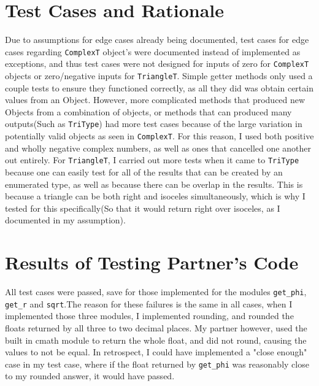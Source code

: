 \documentclass[12pt]{article}
\begin{document}
\section{Test Cases and Rationale} \label{Testing}
Due to assumptions for edge cases already being documented, test cases for edge cases regarding \verb|ComplexT| object's were documented instead of implemented as exceptions, and thus test cases were not designed for inputs of zero for \verb|ComplexT| objects or zero/negative inputs for \verb|TriangleT|. Simple getter methods only used a couple tests to ensure they functioned correctly, as all they did was obtain certain values from an Object. However, more complicated methods that produced new Objects from a combination of objects, or methods that can produced many outputs(Such as \verb|TriType|) had more test cases because of the large variation in potentially valid objects as seen in \verb|ComplexT|. For this reason, I used both positive and wholly negative complex numbers, as well as ones that cancelled one another out entirely. For \verb|TriangleT|, I carried out more tests when it came to \verb|TriType| because one can easily test for all of the results that can be created by an enumerated type, as well as because there can be overlap in the results. This is because a triangle can be both right and isoceles simultaneously, which is why I tested for this specifically(So that it would return right over isoceles, as I documented in my assumption). 
\section{Results of Testing Partner's Code}
All test cases were passed, save for those implemented for the modules \verb|get_phi|, \verb|get_r| and \verb|sqrt|.The reason for these failures is the same in all cases, when I implemented those three modules, I implemented rounding, and rounded the floats returned by all three to two decimal places. My partner however, used the built in cmath module to return the whole float, and did not round, causing the values to not be equal. In retrospect, I could have implemented a "close enough" case in my test case, where if the float returned by  \verb|get_phi| was reasonably close to my rounded answer, it would have passed.
\end{document}

